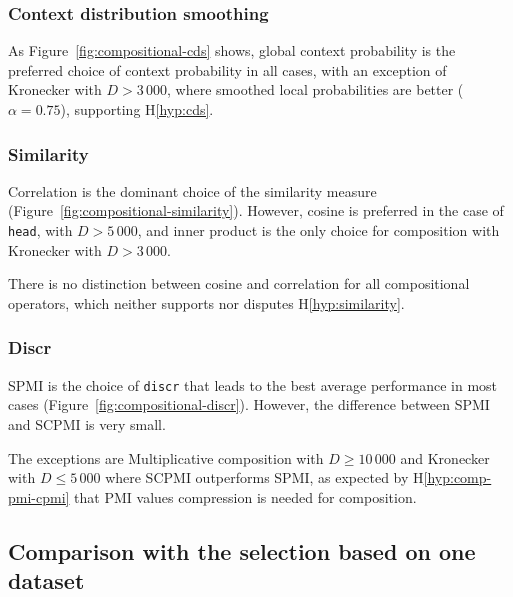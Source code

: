 \subsubsection{Context distribution smoothing}
\label{sec:cont-distr-smooth-compositional}



As Figure~\ref{fig:compositional-cds} shows, global context probability is the preferred choice of context probability in all cases, with an exception of Kronecker with $D > 3\,000$, where smoothed local probabilities are better ($\alpha = 0.75$), supporting H\ref{hyp:cds}.

\subsubsection{Similarity}
\label{sec:similarity-compositional}

Correlation is the dominant choice of the similarity measure (Figure~\ref{fig:compositional-similarity}). However, cosine is preferred in the case of \texttt{head}, with $D > 5\,000$, and inner product is the only choice for composition with Kronecker with $D > 3\,000$.

There is no distinction between cosine and correlation for all compositional operators, which neither supports nor disputes H\ref{hyp:similarity}.
%
%

\subsubsection{Discr}
\label{sec:discr-compositional}



SPMI is the choice of \texttt{discr} that leads to the best average performance in most cases (Figure~\ref{fig:compositional-discr}). However, the difference between SPMI and SCPMI is very small.

The exceptions are Multiplicative composition with $D \geq 10\,000$ and Kronecker with $D \leq 5\,000$ where SCPMI outperforms SPMI, as expected by H\ref{hyp:comp-pmi-cpmi} that PMI values compression is needed for composition.

\subsection{Comparison with the selection based on one dataset}
\label{sec:comp-with-single-comp}

